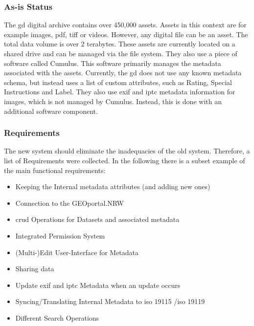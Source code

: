 \documentclass[11pt, titlepage, a4paper]{article}
\begin{document}
\subsubsection{As-is Status}
The \gls{gd} digital archive contains over 450,000 assets. Assets in this context are for example images, \gls{pdf}, \gls{tiff} or videos. However, any digital file can be an asset. The total data volume is over 2 terabytes.
These assets are currently located on a shared drive and can be managed via the file system. They also use a piece of software called Cumulus. This software primarily manages the metadata associated with the assets. Currently, the \gls{gd} does not use any known metadata schema, but instead uses a list of custom attributes, such as Rating, Special Instructions and Label.
They also use \gls{exif} and \gls{iptc} metadata information for images, which is not managed by Cumulus. Instead, this is done with an additional software component. %

\subsubsection{Requirements}
The new system should eliminate the inadequacies of the old system. Therefore, a list of Requirements were collected. In the following there is a subset example of the main functional requirements:
\begin{itemize}
    \item Keeping the Internal metadata attributes (and adding new ones)
    \item Connection to the GEOportal.NRW
    \item \gls{crud} Operations for Datasets and associated metadata
    \item  Integrated Permission System 
    \item (Multi-)Edit User-Interface for Metadata
    \item Sharing data
    \item Update \gls{exif} and \gls{iptc} Metadata when an update occurs
    \item Syncing/Translating Internal Metadata to \gls{iso} 19115 \cite{isoISO1911512014}/\gls{iso} 19119 \cite{isoISO191192016}
    \item Different Search Operations
\end{itemize}
\end{document}
